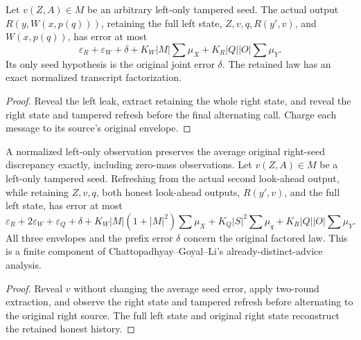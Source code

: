 \begin{theorem}
  \label{thm:lowerbounds-algebraic-fixed-tampering-refresh}
  \leanok
  Let $v(Z,A)\in M$ be an arbitrary left-only tampered seed.
  The actual output $R(y,W(x,p(q)))$, retaining the full left state,
  $Z,v,q,R(y',v)$, and $W(x,p(q))$, has error at most
  \[
    \varepsilon_R+\varepsilon_W+\delta+
      K_W|M|\sum\mu_X+K_R|Q||O|\sum\mu_Y.
  \]
  Its only seed hypothesis is the original joint error $\delta$.
  The retained law has an exact normalized transcript factorization.
\end{theorem}
\begin{proof}
  \leanok
  Reveal the left leak, extract retaining the whole right state, and
  reveal the right state and tampered refresh before the final alternating
  call. Charge each message to its source's original envelope.
\end{proof}

\begin{theorem}
  \label{thm:lowerbounds-algebraic-fixed-tampering-second}
  \leanok
  A normalized left-only observation preserves the average original
  right-seed discrepancy exactly, including zero-mass observations.
  Let $v(Z,A)\in M$ be a left-only tampered seed. Refreshing from the
  actual second look-ahead output, while retaining $Z,v,q$, both honest
  look-ahead outputs, $R(y',v)$, and the full left state, has error at most
  \[
    \varepsilon_R+2\varepsilon_W+\varepsilon_Q+\delta+
      K_W|M|(1+|M|^2)\sum\mu_X+
      K_Q|S|^2\sum\mu_q+K_R|Q||O|\sum\mu_Y.
  \]
  All three envelopes and the prefix error $\delta$ concern the original
  factored law. This is a finite component of Chattopadhyay--Goyal--Li's
  already-distinct-advice analysis.
\end{theorem}
\begin{proof}
  \leanok
  Reveal $v$ without changing the average seed error, apply two-round
  extraction, and observe the right state and tampered refresh before
  alternating to the original right source. The full left state and
  original right state reconstruct the retained honest history.
\end{proof}

